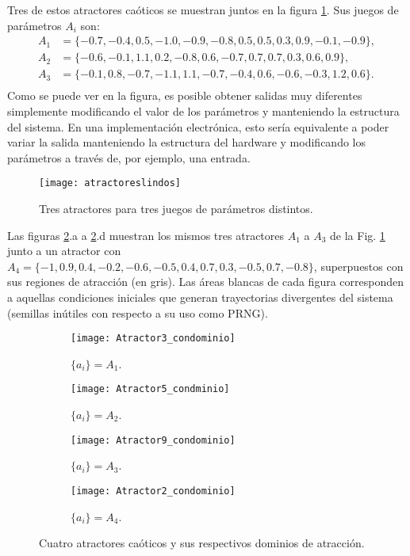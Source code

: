 Tres de estos atractores caóticos se muestran juntos en la figura \ref{fig:atractoresQMaps}.
Sus juegos de parámetros $A_i$ son:	
%
\begin{align*}
A_1&=\{-0.7,-0.4,0.5,-1.0,-0.9,-0.8,0.5,0.5,0.3,0.9,-0.1,-0.9\},\nonumber\\
A_2&=\{-0.6,-0.1,1.1,0.2,-0.8,0.6,-0.7,0.7,0.7,0.3,0.6,0.9\}, \nonumber\\
A_3&=\{ -0.1,0.8,-0.7,-1.1,1.1,-0.7,-0.4,0.6,-0.6,-0.3,1.2,0.6\}.\nonumber\\
\end{align*}
%
Como se puede ver en la figura, es posible obtener salidas muy diferentes simplemente modificando el valor de los parámetros y manteniendo la estructura del sistema.
En una implementación electrónica, esto sería equivalente a poder variar la salida manteniendo la estructura del hardware y modificando los parámetros a través de, por ejemplo, una entrada.
%
\begin{figure}
	\centering
	\texttt{[image: atractoreslindos]}\\
	\caption{Tres atractores para tres juegos de parámetros distintos.}\label{fig:atractoresQMaps}
\end{figure}

Las figuras \ref{fig:atractores3592}.a a \ref{fig:atractores3592}.d muestran los mismos tres atractores $A_1$ a $A_3$ de la Fig. \ref{fig:atractoresQMaps} junto a un atractor con $A_4=\{-1,0.9,0.4,-0.2,-0.6,-0.5,0.4,0.7,0.3,-0.5,0.7,-0.8\}$, superpuestos con sus regiones de atracción (en gris).
Las áreas blancas de cada figura corresponden a aquellas condiciones iniciales que generan trayectorias divergentes del sistema (semillas inútiles con respecto a su uso como PRNG).	
%
\begin{figure}
	\centering
	\begin{subfigure}[b]{0.49\textwidth}
		\texttt{[image: Atractor3\_condominio]}
		\caption{$\{a_i\}=A_1$.}
	\end{subfigure}
	\hfill 
	\begin{subfigure}[b]{0.49\textwidth}
		\texttt{[image: Atractor5\_condminio]}
		\caption{$\{a_i\}=A_2$.}
	\end{subfigure}
	\hfill 
	\begin{subfigure}[b]{0.49\textwidth}
		\texttt{[image: Atractor9\_condominio]}
		\caption{$\{a_i\}=A_3$.}
	\end{subfigure}
	\hfill  
	\begin{subfigure}[b]{0.49\textwidth}
		\texttt{[image: Atractor2\_condominio]}
		\caption{$\{a_i\}=A_4$.}
	\end{subfigure}
	\caption{Cuatro atractores caóticos y sus respectivos dominios de atracción.}
	\label{fig:atractores3592}
\end{figure}
